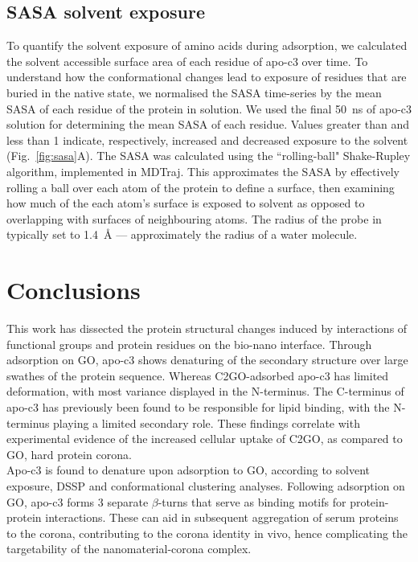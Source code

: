 \subsection{SASA solvent exposure}
To quantify the solvent exposure of amino acids during adsorption, we calculated the solvent accessible surface area of each residue of apo-c3 over time. To understand how the conformational changes lead to exposure of residues that are buried in the native state, we normalised the SASA time-series by the mean SASA of each residue of the protein in solution. We used the final \SI{50}{\nano\second} of apo-c3 solution for determining the mean SASA of each residue. Values greater than and less than \num{1} indicate, respectively, increased and decreased exposure to the solvent (Fig.~\ref{fig:sasa}A). The SASA was calculated using the ``rolling-ball" Shake-Rupley algorithm,\cite{SHRAKE1973} implemented in MDTraj.\cite{McGibbon2015MDTraj} This approximates the SASA by effectively rolling a ball over each atom of the protein to define a surface, then examining how much of the each atom's surface is exposed to solvent as opposed to overlapping with surfaces of neighbouring atoms. The radius of the probe in typically set to \SI{1.4}{\angstrom} --- approximately the radius of a water molecule.


\section{Conclusions}

 This work has dissected the protein structural changes induced by interactions of functional groups and protein residues on the bio-nano interface. Through adsorption on GO, apo-c3 shows denaturing of the secondary structure over large swathes of the protein sequence. Whereas C2GO-adsorbed apo-c3 has limited deformation, with most variance displayed in the N-terminus. The C-terminus of apo-c3 has previously been found to be responsible for lipid binding, with the N-terminus playing a limited secondary role.\cite{sparrow1977lipid, meyers2017aromatic, lambert1996effect} These findings correlate with experimental evidence of the increased cellular uptake of C2GO, as compared to GO, hard protein corona.\cite{mei2018protein} \\

Apo-c3 is found to denature upon adsorption to GO, according to solvent exposure, DSSP and conformational clustering analyses. Following adsorption on GO, apo-c3 forms 3 separate $\beta$-turns that serve as binding motifs for protein-protein interactions. These can aid in subsequent aggregation of serum proteins to the corona, contributing to the corona identity in vivo, hence complicating the targetability of the nanomaterial-corona complex. \\

